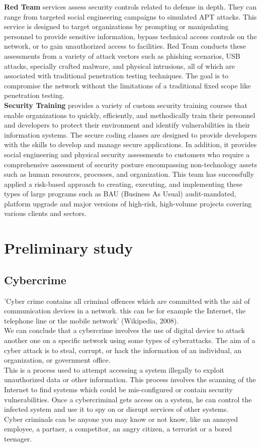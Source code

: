 \textbf{Red Team} services assess security controls related to defense in depth. They can range from targeted social engineering campaigns to simulated APT attacks. This service is designed to target organizations by prompting or manipulating personnel to provide sensitive information, bypass technical access controls on the network, or to gain unauthorized access to facilities. Red Team conducts these assessments from a variety of attack vectors such as phishing scenarios, USB attacks, specially crafted malware, and physical intrusions, all of which are associated with traditional penetration testing techniques. The goal is to compromise the network without the limitations of a traditional fixed scope like penetration testing.\\
\textbf{Security Training} provides a variety of custom security training courses that enable organizations to quickly, efficiently, and methodically train their personnel and developers to protect their environment and identify vulnerabilities in their information systems. The secure coding classes are designed to provide developers with the skills to develop and manage secure applications. In addition, it provides social engineering and physical security assessments to customers who require a comprehensive assessment of security posture encompassing non-technology assets such as human resources, processes, and organization. This team has successfully applied a risk-based approach to creating, executing, and implementing these types of large programs such as BAU (Business As Usual) audit-mandated, platform upgrade and major versions of high-risk, high-volume projects covering various clients and sectors.

\section{Preliminary study}
\subsection{Cybercrime}
'Cyber crime contains all criminal offences which are committed with the aid of communication devices in a network. this can be for example the Internet, the telephone line or the mobile network' (Wikipedia, 2008).\\
We can conclude that a cybercrime involves the use of digital device to attack another one on a specific network using some types of cyberattacks. The aim of a cyber attack is to steal, corrupt, or hack the information of an individual, an organization, or government office.\\
This is a process used to attempt accessing a system illegally to exploit unauthorized data or other information. This process involves the scanning of the Internet to find systems which could be mis-configured or contain security vulnerabilities. Once a cybercriminal gets access on a system, he can control the infected system and use it to spy on or disrupt services of other systems.\\
Cyber criminals can be anyone you may know or not know, like an annoyed employee, a partner, a competitor, an angry citizen, a terrorist or a bored teenager.

